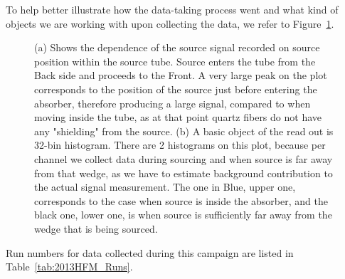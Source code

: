 To help better illustrate how the data-taking process went and what kind of objects we are working with upon collecting the data, we refer to Figure~\ref{fig:Signal_Histogram}.

\begin{figure}[htb]
    \begin{center}
        \caption
        {(a) Shows the dependence of the source signal recorded on source position within the source tube. Source enters the tube from the Back side and proceeds to the Front. A very large peak on the plot corresponds to the position of the source just before entering the absorber, therefore producing a large signal, compared to when moving inside the tube, as at that point quartz fibers do not have any "shielding" from the source. (b) A basic object of the read out is 32-bin histogram. There are 2 histograms on this plot, because per channel we collect data during sourcing and when source is far away from that wedge, as we have to estimate background contribution to the actual signal measurement. The one in Blue, upper one, corresponds to the case when source is inside the absorber, and the black one, lower one, is when source is sufficiently far away from the wedge that is being sourced.
        }
        \label{fig:Signal_Histogram}
    \end{center}
\end{figure}

Run numbers for data collected during this campaign are
listed in Table~\ref{tab:2013HFM_Runs}.

